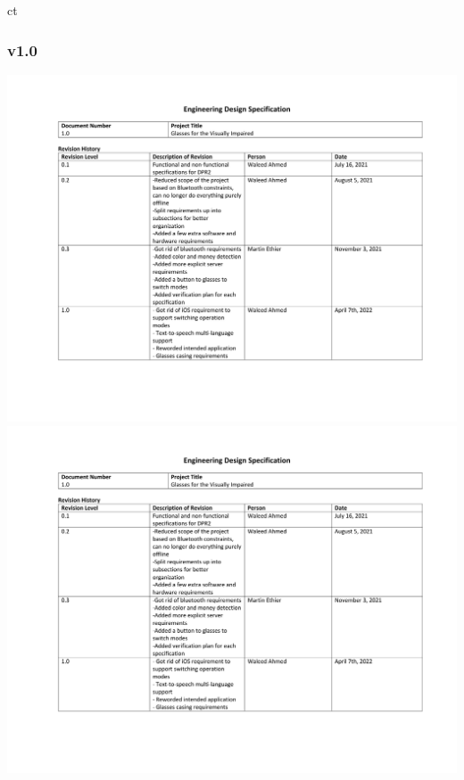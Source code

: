 ct\documentclass[a4paper,11pt]{article}
\begin{document}
\begin{landscape}
        \newpage

    \subsubsection{v1.0}
    \label{eds-1.0}
    \begin{center}
        \includegraphics[page=1,width={0.86\linewidth}]{pdf/eds_1.0.pdf}
        \newpage
        \includegraphics[page=2,width={0.86\linewidth}]{pdf/eds_1.0.pdf}
        \newpage

\end{center}
\end{landscape}
\end{document}
